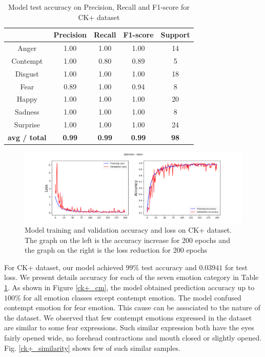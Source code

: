 \documentclass[master]{thesis-uestc}
\begin{document}
\begin{table}[ht]
\renewcommand{\arraystretch}{1.3}
\caption{Model test accuracy on Precision, Recall and F1-score for CK+ dataset}
\label{table_ck+_scores}
\begin{center}
\begin{tabular}{|c|c|c|c|c|}

\hline
 & Precision & Recall & F1-score & Support\\ \hline

Anger & 1.00 & 1.00 & 1.00 & 14\\ \hline
Contempt & 1.00 & 0.80 & 0.89 & 5\\ \hline
Disgust & 1.00 & 1.00 & 1.00 & 18\\ \hline
Fear & 0.89 & 1.00 & 0.94 & 8\\ \hline
Happy & 1.00 & 1.00 & 1.00 & 20\\ \hline
Sadness & 1.00 & 1.00 & 1.00 & 8\\ \hline
Surprise & 1.00 & 1.00 & 1.00 & 24\\ \hline

\textbf{avg / total} & \textbf{0.99} & \textbf{0.99} & \textbf{0.99} & \textbf{98}\\ \hline
\end{tabular}
\end{center}
\end{table}

\begin{figure}[ht]
\includegraphics[width=5in]{pic/XK+_accuracy_and_loss.png}
\caption{Model training and validation accuracy and loss on CK+ dataset. The graph on the left is the accuracy increase for 200 epochs and the graph on the right is the loss reduction for 200 epochs}
\label{ck+accuracy_loss}
\end{figure}

For CK+ dataset, our model achieved $99\%$ test accuracy and $0.03941$ for test loss. We present details accuracy for each of the seven emotion category in Table \ref{table_ck+_scores}. As shown in Figure \ref{ck+_cm}, the model obtained prediction accuracy up to $100\%$ for all emotion classes except contempt emotion. The model confused contempt emotion for fear emotion. This cause can be associated to the nature of the dataset. We observed that few contempt emotions expressed in the dataset are similar to some fear expressions. Such similar expression both have the eyes fairly opened wide, no forehead contractions and mouth closed or slightly opened. Fig. \ref{ck+_similarity} shows few of such similar samples.
\end{document}
